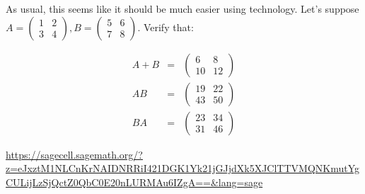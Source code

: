 \documentclass[10pt]{article}
\theoremstyle{definition}
\begin{document}
As usual, this seems like it should be much easier using technology.  Let's suppose $A=\begin{pmatrix} 1 & 2 \\ 3 & 4\end{pmatrix}, B=\begin{pmatrix} 5 & 6 \\ 7 & 8\end{pmatrix}$.  Verify that:

\begin{eqnarray*}
A+B&=&\begin{pmatrix} 6 & 8 \\ 10 & 12\end{pmatrix}\\
AB&=&\begin{pmatrix} 19 & 22 \\ 43 & 50\end{pmatrix}\\
BA&=&\begin{pmatrix} 23 & 34 \\ 31 & 46\end{pmatrix}
\end{eqnarray*}


\url{https://sagecell.sagemath.org/?z=eJxztM1NLCnKrNAIDNRRiI421DGK1Yk21jGJjdXk5XJClTTVMQNKmutYgCULijLzSjQctZ0QbC0E20nLURMAu6IZgA==&lang=sage}
\end{document}
